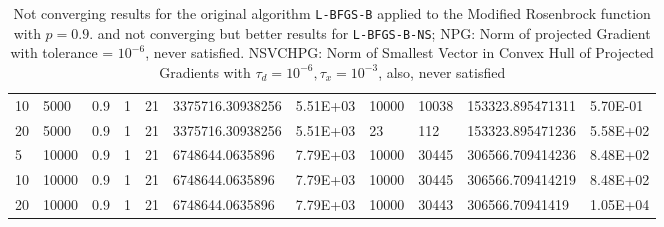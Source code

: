 \begin{table}
\begin{center}
\begin{tabular}{|l|l|l|l|l|l|l|l|l|l|l|}
      10 & 5000 & 0.9 & 1 & 21 & 3375716.30938256 & 5.51E+03 & 10000 & 10038 & 153323.895471311 & 5.70E-01\\
      20 & 5000 & 0.9 & 1 & 21 & 3375716.30938256 & 5.51E+03 & 23 & 112 & 153323.895471236 & 5.58E+02\\
      5 & 10000 & 0.9 & 1 & 21 & 6748644.0635896 & 7.79E+03 & 10000 & 30445 & 306566.709414236 & 8.48E+02\\
      10 & 10000 & 0.9 & 1 & 21 & 6748644.0635896 & 7.79E+03 & 10000 & 30445 & 306566.709414219 & 8.48E+02\\
      20 & 10000 & 0.9 & 1 & 21 & 6748644.0635896 & 7.79E+03 & 10000 & 30443 & 306566.70941419 & 1.05E+04\\
      \hline
    \end{tabular}
    \caption[A value where \texttt{L-BFGS-B-NS} is supposed to fail. $p = 0.9$]{Not converging results for the original algorithm \texttt{L-BFGS-B} applied to the Modified Rosenbrock function with $p = 0.9$.  and not converging but better results for \texttt{L-BFGS-B-NS}; NPG: Norm of projected Gradient with tolerance = $10^{-6}$, never satisfied. NSVCHPG: Norm of Smallest Vector in Convex Hull of Projected Gradients with $\tau_d = 10^{-6}, \tau_x = 10^{-3}$, also, never satisfied}
    \label{p09}
  \end{center}
\end{table}


\pagebreak
\pagebreak
\clearpage
